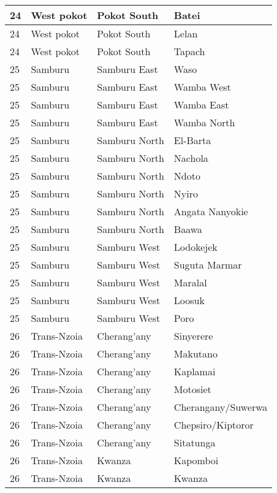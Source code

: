 \begin{table}[!ht]
\begin{tabular}{|l|l|l|l|}
        24 & West pokot & Pokot South & Batei \\ \hline
        24 & West pokot & Pokot South & Lelan \\ \hline
        24 & West pokot & Pokot South & Tapach \\ \hline
        25 & Samburu & Samburu East & Waso \\ \hline
        25 & Samburu & Samburu East & Wamba West \\ \hline
        25 & Samburu & Samburu East & Wamba East \\ \hline
        25 & Samburu & Samburu East & Wamba North \\ \hline
        25 & Samburu & Samburu North & El-Barta \\ \hline
        25 & Samburu & Samburu North & Nachola \\ \hline
        25 & Samburu & Samburu North & Ndoto \\ \hline
        25 & Samburu & Samburu North & Nyiro \\ \hline
        25 & Samburu & Samburu North & Angata Nanyokie \\ \hline
        25 & Samburu & Samburu North & Baawa \\ \hline
        25 & Samburu & Samburu West & Lodokejek \\ \hline
        25 & Samburu & Samburu West & Suguta Marmar \\ \hline
        25 & Samburu & Samburu West & Maralal \\ \hline
        25 & Samburu & Samburu West & Loosuk \\ \hline
        25 & Samburu & Samburu West & Poro \\ \hline
        26 & Trans-Nzoia & Cherang’any & Sinyerere \\ \hline
        26 & Trans-Nzoia & Cherang’any & Makutano \\ \hline
        26 & Trans-Nzoia & Cherang’any & Kaplamai \\ \hline
        26 & Trans-Nzoia & Cherang’any & Motosiet \\ \hline
        26 & Trans-Nzoia & Cherang’any & Cherangany/Suwerwa \\ \hline
        26 & Trans-Nzoia & Cherang’any & Chepsiro/Kiptoror \\ \hline
        26 & Trans-Nzoia & Cherang’any & Sitatunga \\ \hline
        26 & Trans-Nzoia & Kwanza & Kapomboi \\ \hline
        26 & Trans-Nzoia & Kwanza & Kwanza \\ \hline

\end{tabular}
\end{table}
